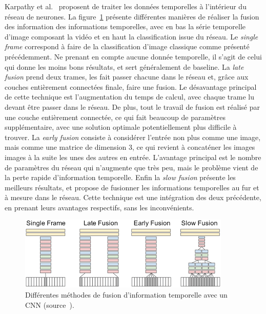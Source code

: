 Karpathy et al.~\cite{karpathy2014large} proposent de traiter les données temporelles à l'intérieur du réseau de neurones.
La figure~\ref{fig:videofusion} présente différentes manières de réaliser la fusion des information des informations temporelles, avec en bas la série temporelle d'image composant la vidéo et en haut la classification issue du réseau.
Le \textit{single frame} correspond à faire de la classification d'image classique comme présenté précédemment.
Ne prenant en compte aucune donnée temporelle, il s'agit de celui qui donne les moins bons résultats, et sert généralement de baseline.
La \textit{late fusion} prend deux trames, les fait passer chacune dans le réseau et, grâce aux couches entièrement connectées finale, faire une fusion.
Le désavantage principal de cette technique est l'augmentation du temps de calcul, avec chaque trame lu devant être passer dans le réseau.
De plus, tout le travail de fusion est réalisé par une couche entièrement connectée, ce qui fait beaucoup de paramètres supplémentaire, avec une solution optimale potentiellement plus difficile à trouver.
La \textit{early fusion} consiste à considérer l'entrée non plus comme une image, mais comme une matrice de dimension 3, ce qui revient à concaténer les images images à la suite les unes des autres en entrée.
L'avantage principal est le nombre de paramètres du réseau qui n'augmente que très peu, mais le problème vient de la perte rapide d'information temporelle.
Enfin la \textit{slow fusion} présente les meilleurs résultats, et propose de fusionner les informations temporelles au fur et à mesure dans le réseau.
Cette technique est une intégration des deux précédente, en prenant leurs avantages respectifs, sans les inconvénients.

\begin{figure}[ht!]
\centering
\includegraphics[width=\columnwidth]{figures/videofusion.png}%
\caption{Différentes méthodes de fusion d'information temporelle avec un CNN (source~\cite{karpathy2014large}).}
\label{fig:videofusion}
\end{figure}

